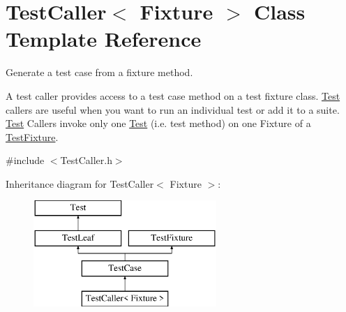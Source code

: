 \hypertarget{class_test_caller}{\section{Test\-Caller$<$ Fixture $>$ Class Template Reference}
\label{class_test_caller}
}


Generate a test case from a fixture method.

A test caller provides access to a test case method on a test fixture class. \hyperlink{class_test}{Test} callers are useful when you want to run an individual test or add it to a suite. \hyperlink{class_test}{Test} Callers invoke only one \hyperlink{class_test}{Test} (i.\-e. test method) on one Fixture of a \hyperlink{class_test_fixture}{Test\-Fixture}.  




{\ttfamily \#include $<$Test\-Caller.\-h$>$}

Inheritance diagram for Test\-Caller$<$ Fixture $>$\-:\begin{figure}[H]
\begin{center}
\leavevmode
\includegraphics[height=4.000000cm]{class_test_caller}
\end{center}
\end{figure}
